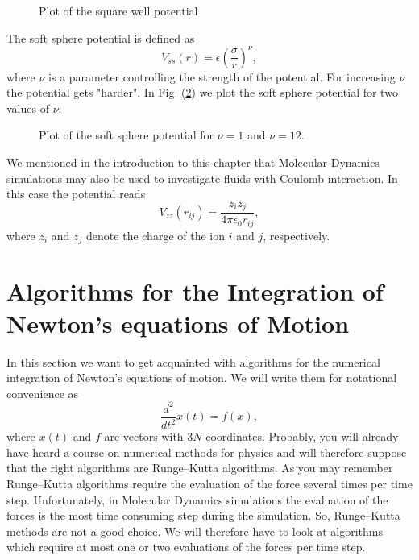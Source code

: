 \begin{figure}
\label{Fig:SquareWell}
\caption{Plot of the square well potential}
\end{figure}

The soft sphere potential is defined as
\begin{displaymath}
  V_{ss}(r)= \epsilon \left( \frac{\sigma}{r} \right)^{\nu},
\end{displaymath}
where $\nu$ is a parameter controlling the strength of the potential. For
increasing $\nu$ the potential gets "harder". In Fig. (\ref{Fig:SoftSphere})
we plot the soft sphere potential for two values of $\nu$.

\begin{figure}
\label{Fig:SoftSphere}
\caption{Plot of the soft sphere potential for $\nu=1$ and $\nu=12$.}
\end{figure}

We mentioned in the introduction to this chapter that Molecular Dynamics
simulations may also be used to investigate fluids with Coulomb interaction.
In this case the potential reads
\begin{displaymath}
  V_{zz} (r_{ij}) = \frac{z_i z_j}{4 \pi \epsilon_0 r_{ij}},
\end{displaymath}
where $z_i$ and $z_j$ denote the charge of the ion $i$ and $j$, respectively.


\section{Algorithms for the Integration of Newton's equations of Motion}
In this section we want to get acquainted with algorithms for the numerical
integration of Newton's equations of motion. We will write them for notational
convenience as
\begin{displaymath}
  \frac{d^2}{dt^2} x(t) = f(x),
\end{displaymath}
where $x(t)$ and $f$ are vectors with $3N$ coordinates. 
Probably, you will already have heard a course on numerical methods for
physics and will therefore suppose that the right algorithms are Runge--Kutta
algorithms. As you may remember Runge--Kutta algorithms require the 
evaluation of the force several times per time step. Unfortunately,
in Molecular Dynamics simulations the evaluation of the forces is the most
time consuming step during the simulation. So, Runge--Kutta methods are not a
good choice. We will therefore have to look at algorithms which require at
most one or two evaluations of the forces per time step.

